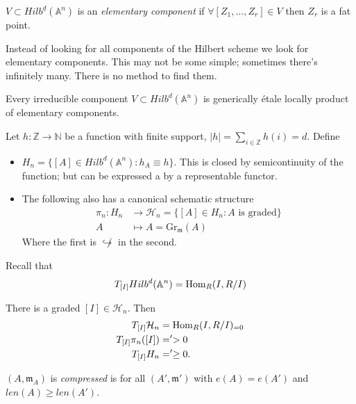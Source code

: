 {\begin{definition}
\label{definition-elementary-componenet}
$V \subset Hilb^{\underline{d}}(\mathbb{A}^n)$ is
an {\it elementary component} if
$\forall [Z_1,\ldots,Z_r] \in V$
then $Z_r$ is a fat point.
\end{definition}

Instead of looking for all components of the Hilbert scheme
we look for elementary components. This may not be some simple;
sometimes there's infinitely many. There
is no method to find them.

\begin{theorem}[Irrabaro]
\label{theorem-I}
Every irreducible component $V \subset Hilb^d(\mathbb{A}^n)$ 
is generically étale locally product of elementary components.
\end{theorem}

\begin{definition}
\label{definition-}
Let $h:\mathbb{Z} \to \mathbb{N}$ be a function
with finite support, $|h|=\sum_{ i \in \mathbb{Z}}h(i)=d$. Define
\begin{itemize}
\item $H_n=\{[A] \in Hilb^d(\mathbb{A}^n): h_A \equiv h\}$.
This is closed by semicontinuity of the function; but can be expressed
a by a representable functor.
\item The following also has a canonical schematic structure
\begin{align*}
\pi_n:H_n  &\longrightarrow \mathcal{H}_n=\{[A] \in H_n: A\text{ is graded}\} \\
A &\longmapsto A=\text{Gr}_{\mathfrak{m}}(A)
\end{align*}
Where the first is $\not\hookrightarrow $ in the second.
\end{itemize}
\end{definition}

Recall that
$$
T_{[I]}Hilb^d(\mathbb{A}^n)=\mathop{\mathrm{Hom}}\nolimits_R(I,R/I)
$$
\begin{theorem}[B-B,J,G G G L]
\label{theorem-B-B-J-G-G-G-L}
There is a graded $[I] \in \mathcal{H}_n$.
Then
\begin{align*}
T_{[I]}\mathcal{H}_n&=\mathop{\mathrm{Hom}}\nolimits_R(I,R/I)_{=0}\\
T_{[I]}\pi_n([I])&='>0\\
T_{[I]}H_n&=' \geq 0.
\end{align*}
\end{theorem}

\begin{definition}
\label{definition-compressed}
$(A,\mathfrak{m}_A)$ is {\it compressed} is for all  $(A',\mathfrak{m}')$ 
with $e(A)=e(A')$ and $len(A) \geq  len(A') $.
\end{definition}

}
